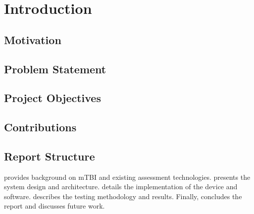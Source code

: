 \chapter{Introduction}
\label{chapter:introduction}




\section{Motivation}



\section{Problem Statement}



\section{Project Objectives}



\section{Contributions}



\section{Report Structure}

 provides background on mTBI and existing assessment technologies.  presents the system design and architecture.  details the implementation of the device and software.  describes the testing methodology and results. Finally,  concludes the report and discusses future work.
